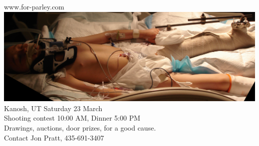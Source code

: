 \begin{frame}{www.for-parley.com}
    \centering
    \includegraphics[width=.98\textwidth]{img/parley.png} \\
    \vspace{16pt}
    Kanosh, UT  Saturday 23 March \\
    Shooting contest 10:00 AM, Dinner 5:00 PM \\
    Drawings, auctions, door prizes, for a good cause. \\
    Contact Jon Pratt, 435-691-3407 \\
\end{frame}

